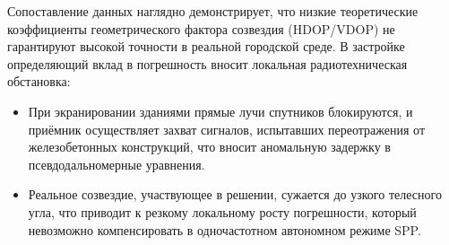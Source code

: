 Сопоставление данных наглядно демонстрирует, что низкие теоретические коэффициенты геометрического фактора созвездия (HDOP/VDOP) не гарантируют высокой точности в реальной городской среде. В застройке определяющий вклад в погрешность вносит локальная радиотехническая обстановка:
\begin{itemize}
    \item При экранировании зданиями прямые лучи спутников блокируются, и приёмник осуществляет захват сигналов, испытавших переотражения от железобетонных конструкций, что вносит аномальную задержку в псевдодальномерные уравнения.
    \item Реальное созвездие, участвующее в решении, сужается до узкого телесного угла, что приводит к резкому локальному росту погрешности, который невозможно компенсировать в одночастотном автономном режиме SPP.
\end{itemize}
